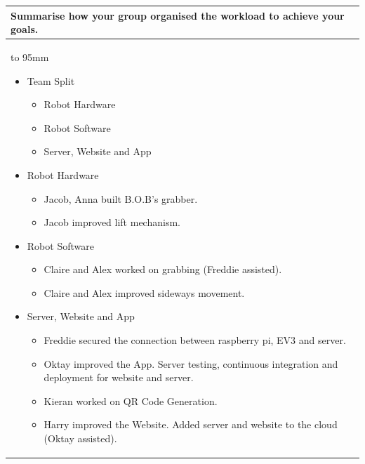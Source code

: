 \documentclass[a4paper]{article}
\newcommand{\colWidth}{141mm}
\begin{document}
\begin{center}

\begin{tabular}{|p{\colWidth}|}
	\hline
	\cellcolor{blue!25}\large
	\textbf{Summarise how your group organised the workload to achieve your goals.}
	\\ \hline
	\vtop to 95mm{
	\begin{itemize}
	    \item Team Split
	    \begin{itemize}
	        \item Robot Hardware
	        \item Robot Software
	        \item Server, Website and App 
	    \end{itemize}
	    \item Robot Hardware
	    \begin{itemize}
	        \item Jacob, Anna built B.O.B's grabber.
	        \item Jacob improved lift mechanism.
	    \end{itemize}
	    \item Robot Software
	    \begin{itemize}
	        \item Claire and Alex worked on grabbing (Freddie assisted). 
	        \item Claire and Alex improved sideways movement.
	    \end{itemize}
	    \item Server, Website and App 
	    \begin{itemize}
	        \item Freddie secured the connection between raspberry pi, EV3 and server. 
	        \item Oktay improved the App. Server testing, continuous integration and deployment for website and server. 
	        \item Kieran worked on QR Code Generation.
	        \item Harry improved the Website. Added server and website to the cloud (Oktay assisted).
	    \end{itemize}
	\end{itemize}
  }
  \\
  \hline
\end{tabular}
\vskip 5mm



\end{center}
\end{document}
